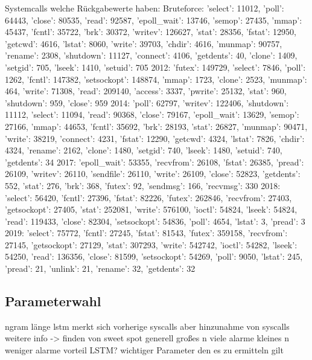             Systemcalls welche Rückgabewerte haben:
                Bruteforce: {'select': 11012, 
                             'poll': 64443,
                             'close': 80535,
                             'read': 92587,
                             'epoll_wait': 13746,
                             'semop': 27435,
                             'mmap': 45437,
                             'fcntl': 35722,
        'brk': 30372, 'writev': 126627, 'stat': 28356, 'fstat': 12950, 'getcwd': 4616, 'lstat': 8060, 'write': 39703, 'chdir': 4616, 'munmap': 90757, 'rename': 2308, 'shutdown': 11127, 'connect': 4106, 'getdents': 40, 'clone': 1409, 'setgid': 705, 'lseek': 1410, 'setuid': 705}
                2012: {'futex': 149729, 'select': 7846, 'poll': 1262, 'fcntl': 147382, 'setsockopt': 148874, 'mmap': 1723, 'clone': 2523, 'munmap': 464, 'write': 71308, 'read': 209140, 'access': 3337, 'pwrite': 25132, 'stat': 960, 'shutdown': 959, 'close': 959}
                2014: {'poll': 62797, 'writev': 122406, 'shutdown': 11112, 'select': 11094, 'read': 90368, 'close': 79167, 'epoll_wait': 13629, 'semop': 27166, 'mmap': 44653, 'fcntl': 35692, 'brk': 28193, 'stat': 26827, 'munmap': 90471, 'write': 38219, 'connect': 4231, 'fstat': 12290, 'getcwd': 4324, 'lstat': 7826, 'chdir': 4324, 'rename': 2162, 'clone': 1480, 'setgid': 740, 'lseek': 1480, 'setuid': 740, 'getdents': 34} 
                2017: {'epoll_wait': 53355, 'recvfrom': 26108, 'fstat': 26385, 'pread': 26109, 'writev': 26110, 'sendfile': 26110, 'write': 26109, 'close': 52823, 'getdents': 552, 'stat': 276, 'brk': 368, 'futex': 92, 'sendmsg': 166, 'recvmsg': 330} 
                2018: {'select': 56420, 'fcntl': 27396, 'fstat': 82226, 'futex': 262846, 'recvfrom': 27403, 'getsockopt': 27405, 'stat': 252081, 'write': 576100, 'ioctl': 54824, 'lseek': 54824, 'read': 119433, 'close': 82304, 'setsockopt': 54836, 'poll': 4654, 'lstat': 3, 'pread': 3} 
                2019: {'select': 75772, 'fcntl': 27245, 'fstat': 81543, 'futex': 359158, 'recvfrom': 27145, 'getsockopt': 27129, 'stat': 307293, 'write': 542742, 'ioctl': 54282, 'lseek': 54250, 'read': 136356, 'close': 81599, 'setsockopt': 54269, 'poll': 9050, 'lstat': 245, 'pread': 21, 'unlink': 21, 'rename': 32, 'getdents': 32}
\subsection{Parameterwahl}
        ngram länge
        lstm merkt sich vorherige syscalls aber hinzunahme von syscalls weitere info
        -> finden von sweet spot
        generell großes n viele alarme
        kleines n weniger alarme  vorteil LSTM\@?
        wichtiger Parameter den es zu ermitteln gilt

